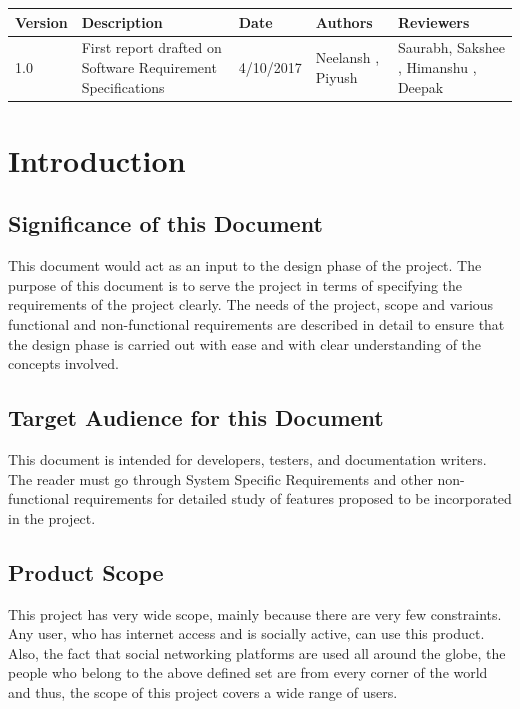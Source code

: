 \documentclass[12pt]{article}
\begin{document}
\begin{center}
		\begin{tabular}{ | m{2em} | m{8em} | m{4em} | m{5em} | m{5em} | }
			\hline
			Version & Description                         & Date       & Authors                   & Reviewers           \\
			\hline
			1.0     & First report drafted on Software Requirement Specifications & 4/10/2017  & Neelansh , Piyush & Saurabh, Sakshee , Himanshu , Deepak \\
			\hline
			
		\end{tabular}
    		
	\end{center}
\newpage
\tableofcontents
\newpage

\section{Introduction}
\subsection{Significance of this Document}
This document would act as an input to the design phase of the project.
The purpose of this document is to serve the project in terms of specifying
the requirements of the project clearly. The needs of the project, scope
and various functional and non-functional requirements are described in
detail to ensure that the design phase is carried out with ease and with
clear understanding of the concepts involved.

\subsection{Target Audience for this Document}
This document is intended for developers, testers, and documentation writers.
The reader must go through System Specific Requirements and other non-functional requirements for detailed study of features proposed to be incorporated in the project.

\subsection{Product Scope}
This project has very wide scope, mainly because there are very few
constraints. Any user, who has internet access and is socially active, can
use this product. Also, the fact that social networking platforms are used
all around the globe, the people who belong to the above defined set are
from every corner of the world and thus, the scope of this project covers
a wide range of users.
\end{document}
